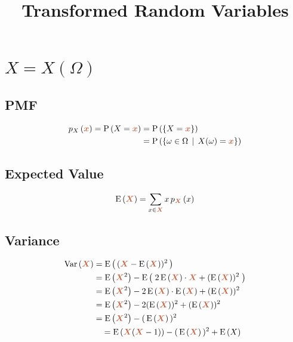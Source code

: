 \documentclass{article}
\title{Transformed Random Variables}
\date{} %
\DeclareRobustCommand{\myRandV}[1]{#1} %
\newcommand{\myPMF}[2]{p_{#1}\left(#2\right)}
\newcommand{\myP}[1]{\operatorname{P}\left(#1\right)} %
\newcommand{\myExpect}[1]{\operatorname{E}\left(#1\right)} %
\newcommand{\myVariance}[1]{\operatorname{Var}\left(#1\right)}
\newcommand{\myParam}[1]{\textcolor{myParamColor}{\bm{#1}}}
\begin{document}
\maketitle

\section{$X = X(\Omega)$}
\subsection{PMF}
\begin{equation*}
\begin{aligned}
    \myPMF{\myRandV{X}}{\myParam{x}} = \myP{\myRandV{X} = \myParam{x}} &= \myP{\{\myRandV{X} = \myParam{x}\}} \\
    &= \myP{\{\omega \in \Omega \, \mid \, \myRandV{X}(\omega) = \myParam{x} \}}
\end{aligned}
\end{equation*}

\subsection{Expected Value}
\begin{equation*}
\begin{aligned}
    \myExpect{\myParam{\myRandV{X}}} &= \sum_{x \in \myParam{\myRandV{X}}} x \, \myPMF{\myParam{\myRandV{X}}}{x} \\
\end{aligned}
\end{equation*}


\subsection{Variance}
\begin{equation*}
\begin{aligned}
    \myVariance{\myParam{\myRandV{X}}} &= \myExpect{\,(\myParam{\myRandV{X}} - \myExpect{\myParam{\myRandV{X}}})^2 \,} \\
    &= \myExpect{\myParam{\myRandV{X}}^2} - \myExpect{\;2\myExpect{\myParam{\myRandV{X}}}\cdot\myParam{\myRandV{X}} + (\myExpect{\myParam{\myRandV{X}}})^2\;} \\
    &= \myExpect{\myParam{\myRandV{X}}^2} - 2\myExpect{\myParam{\myRandV{X}}}\cdot\myExpect{\myParam{\myRandV{X}}} + (\myExpect{\myParam{\myRandV{X}}})^2 \\
    &= \myExpect{\myParam{\myRandV{X}}^2} - 2(\myExpect{\myParam{\myRandV{X}}})^2 + (\myExpect{\myParam{\myRandV{X}}})^2 \\
    &= \myExpect{\myParam{\myRandV{X}}^2} - (\, \myExpect{\myParam{\myRandV{X}}}\, )^2 \\
    &\quad = \myExpect{\myParam{\myRandV{X}}(\myParam{\myRandV{X}}-1)} - (\, \myExpect{\myParam{\myRandV{X}}}\, )^2 + \myExpect{\myRandV{X}}\\
\end{aligned}
\end{equation*}
\end{document}
